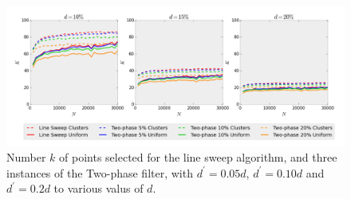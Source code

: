 \begin{figure}[!h]   
	\vspace{-10pt}
	\centering
	\includegraphics[width=\linewidth]{Pictures/ls_bp_k} 
	\caption[Number $k$ of points selected for Line Sweep and Two-phase filter algorithms.]{Number $k$ of points selected for the line sweep algorithm, and three instances of the Two-phase filter, with $d^\prime=0.05d$, $d^\prime=0.10d$ and $d^\prime=0.2d$ to various valus of $d$.}
	\label{fig:ls_bp_k} 
\end{figure}